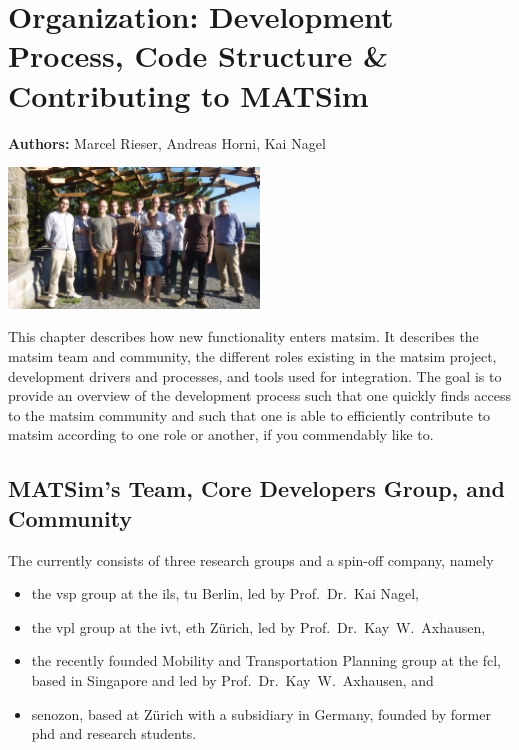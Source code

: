 \chapter{Organization: Development Process, Code Structure \& Contributing to MATSim}
\label{ch:developmentprocess}

\hfill \textbf{Authors:} Marcel Rieser, Andreas Horni, Kai Nagel

\begin{center} \includegraphics[width=0.5\textwidth, angle=0]{extending/figures/ConceptualMeetingVillaHatt.jpg} \end{center}

This chapter describes how new functionality enters \gls{matsim}. It describes the \gls{matsim} team and community, the different roles existing in the \gls{matsim} project, development drivers and processes, and tools used for integration. The goal is to 
provide an overview of the development process such that 
one quickly finds access to the \gls{matsim} community and such that 
one is able to efficiently contribute to \gls{matsim} according to one role or another, if you commendably like to.

\section{MATSim's Team, Core Developers Group, and Community}
The  
currently consists of three research groups and a spin-off company, namely 
\begin{itemize}\styleItemize
\item the \gls{vsp} group at the \gls{ils}, \gls{tu} Berlin, led by Prof.~Dr.~Kai Nagel,
\item the \gls{vpl} group at the \gls{ivt}, \gls{eth} Zürich, led by Prof.~Dr.~Kay~W.~Axhausen, 
\item the recently founded Mobility and Transportation Planning group at the \gls{fcl}, based in Singapore and led by Prof.~Dr.~Kay~W.~Axhausen, and 
\item \gls{senozon}, based at Zürich with a subsidiary in Germany, founded by former \acrshort{phd} and research students. 
\end{itemize}

